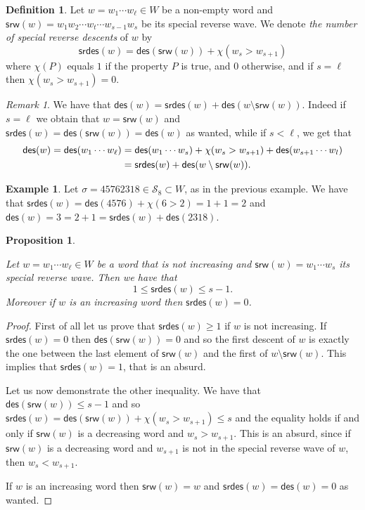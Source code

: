 \documentclass[a4paper]{amsart}
\newcommand{\des}{\mathsf{des}}
\newcommand{\srw}{\mathsf{srw}}
\newcommand{\srdes}{\mathsf{srdes}}
\newtheorem{proposition}[theorem]{Proposition}
\theoremstyle{definition}
\newtheorem{definition}[theorem]{Definition}
\newtheorem{example}[theorem]{Example}
\theoremstyle{remark}
\newtheorem{remark}[theorem]{Remark}
\numberwithin{equation}{section}
\begin{document}
\begin{definition}
    \label{def:special_reverse_des}
    Let $w=w_1\cdots w_{\ell}\in W$ be a non-empty word and $\srw(w)=w_1w_{2}\cdots w_t\cdots w_{s-1}w_s$ be its special reverse wave. We denote \textit{the number of special reverse descents} of $w$ by
    \begin{equation}
        \srdes(w)=\des(\srw(w))+\chi(w_s>w_{s+1})
    \end{equation}
    where $\chi(P)$ equals $1$ if the property $P$ is true, and $0$ otherwise, and if $s=\ell$ then $\chi(w_s>w_{s+1})=0$.
\end{definition}

\begin{remark}\label{rem:des_rspezza}
We have that $\des(w)=\srdes(w)+\des(w\setminus\srw(w))$. Indeed if $s=\ell$  we obtain that $w=\srw(w)$ and $\srdes(w)=\des(\srw(w))=\des(w)$ as wanted, while if $s<\ell$, we get that
\begin{align}
    \des(w)=\des(w_1\cdots w_{\ell})&= \des(w_1\cdots w_{s})+\chi(w_{s}>w_{s+1})+\des(w_{s+1}\cdots w_l)\\
    &=\srdes(w)+\des(w\setminus\srw(w))\notag.
\end{align}
\end{remark}

\begin{example}\label{ex:srw_spezza}
Let $\sigma=45762318\in \mathcal{S}_8\subset W$, as in the previous example. We have that $\srdes(w)=\des(4576)+\chi(6>2)=1+1=2$ and $\des(w)=3=2+1=\srdes(w)+\des(2318)$.
\end{example}

\begin{proposition}\label{prop:rdes_not_0}

Let $w=w_1\cdots w_{\ell}\in W$ be a word that is not increasing and $\srw(w)=w_1\cdots w_s$ its special reverse wave. Then we have that
\begin{equation}\label{eq:des_spezza2}
1\leq\srdes(w)\leq s-1.
\end{equation}   
Moreover if $w$ is an increasing word then $\srdes(w)=0$.
\end{proposition}

\begin{proof}
First of all let us prove that $\srdes(w)\geq1$ if $w$ is not increasing. If $\srdes(w)=0$ then $\des(\srw(w))=0$ and so the first descent of $w$ is exactly the one between the last element of $\srw(w)$ and the first of $w\setminus\srw(w)$. This implies that $\srdes(w)=1$, that is an absurd.   

Let us now demonstrate the other inequality.
We have that $\des(\srw(w))\leq s-1$ and so $\srdes(w)=\des(\srw(w))+\chi(w_s>w_{s+1})\leq s$ and the equality holds if and only if  $\srw(w)$ is a decreasing word and $w_s>w_{s+1}$. This is an absurd, since if $\srw(w)$ is a decreasing word and $w_{s+1}$ is not in the special reverse wave of $w$, then $w_s<w_{s+1}$.

If $w$ is an increasing word then $\srw(w)=w$ and $\srdes(w)=\des(w)=0$ as wanted.
\end{proof}
\end{document}
